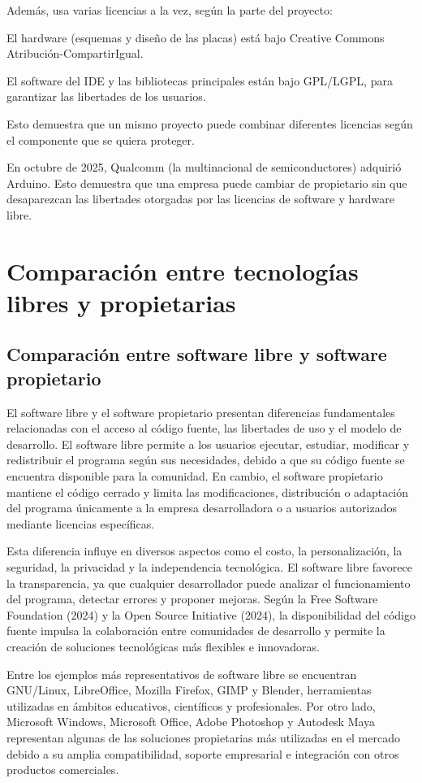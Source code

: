 \documentclass[12pt]{article}
\begin{document}
	Además, usa varias licencias a la vez, según la parte del proyecto:
	
	El hardware (esquemas y diseño de las placas) está bajo Creative Commons Atribución-CompartirIgual.

	El software del IDE y las bibliotecas principales están bajo GPL/LGPL, para garantizar las libertades de los usuarios.
	
	Esto demuestra que un mismo proyecto puede combinar diferentes licencias según el componente que se quiera proteger.
	
	En octubre de 2025, Qualcomm (la multinacional de semiconductores) adquirió Arduino. Esto demuestra que una empresa puede cambiar de propietario sin que desaparezcan las libertades otorgadas por las licencias de software y hardware libre.
	
	\section{Comparación entre tecnologías libres y propietarias}
	\subsection{Comparación entre software libre y software propietario}
	
	El software libre y el software propietario presentan diferencias fundamentales relacionadas con el acceso al código fuente, las libertades de uso y el modelo de desarrollo. El software libre permite a los usuarios ejecutar, estudiar, modificar y redistribuir el programa según sus necesidades, debido a que su código fuente se encuentra disponible para la comunidad. En cambio, el software propietario mantiene el código cerrado y limita las modificaciones, distribución o adaptación del programa únicamente a la empresa desarrolladora o a usuarios autorizados mediante licencias específicas.
	
	Esta diferencia influye en diversos aspectos como el costo, la personalización, la seguridad, la privacidad y la independencia tecnológica. El software libre favorece la transparencia, ya que cualquier desarrollador puede analizar el funcionamiento del programa, detectar errores y proponer mejoras. Según la Free Software Foundation (2024) y la Open Source Initiative (2024), la disponibilidad del código fuente impulsa la colaboración entre comunidades de desarrollo y permite la creación de soluciones tecnológicas más flexibles e innovadoras.
	
	Entre los ejemplos más representativos de software libre se encuentran GNU/Linux, LibreOffice, Mozilla Firefox, GIMP y Blender, herramientas utilizadas en ámbitos educativos, científicos y profesionales. Por otro lado, Microsoft Windows, Microsoft Office, Adobe Photoshop y Autodesk Maya representan algunas de las soluciones propietarias más utilizadas en el mercado debido a su amplia compatibilidad, soporte empresarial e integración con otros productos comerciales.
	
\end{document}
